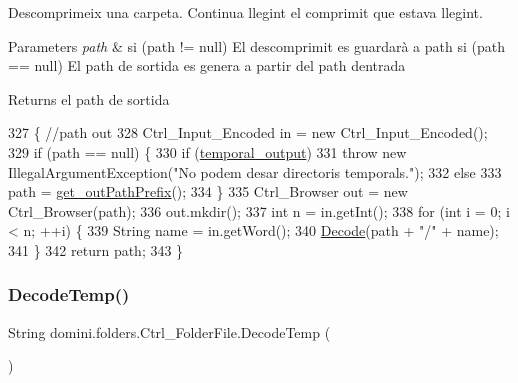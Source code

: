 Descomprimeix una carpeta. Continua llegint el comprimit que estava llegint. 


\begin{DoxyParams}{Parameters}
{\em path} & si (path != null) El descomprimit es guardarà a path si (path == null) El path de sortida es genera a partir del path d\textquotesingle{}entrada \\
\hline
\end{DoxyParams}
\begin{DoxyReturn}{Returns}
el path de sortida 
\end{DoxyReturn}

\begin{DoxyCode}
327                                              \{ \textcolor{comment}{//path out }
328         Ctrl\_Input\_Encoded in = \textcolor{keyword}{new} Ctrl\_Input\_Encoded();
329         \textcolor{keywordflow}{if} (path == null) \{
330             \textcolor{keywordflow}{if} (\hyperlink{classdomini_1_1folders_1_1Ctrl__FolderFile_a0db81590abe27b21a9b8c37633c86fa6}{temporal\_output})
331                 \textcolor{keywordflow}{throw} \textcolor{keyword}{new} IllegalArgumentException(\textcolor{stringliteral}{"No podem desar directoris temporals."});
332             \textcolor{keywordflow}{else}
333                 path = \hyperlink{classdomini_1_1folders_1_1Ctrl__FolderFile_a11c6b1b4a25d12b8091c7c96b3da1ea7}{get\_outPathPrefix}();
334         \}
335         Ctrl\_Browser out = \textcolor{keyword}{new} Ctrl\_Browser(path);
336         out.mkdir();
337         \textcolor{keywordtype}{int} n = in.getInt();
338         \textcolor{keywordflow}{for} (\textcolor{keywordtype}{int} i = 0; i < n; ++i) \{
339             String name = in.getWord();
340             \hyperlink{classdomini_1_1folders_1_1Ctrl__FolderFile_a5d28ac7f5223ecd40a242148e86447c1}{Decode}(path + \textcolor{stringliteral}{"/"} + name);
341         \}
342         \textcolor{keywordflow}{return} path;
343     \}
\end{DoxyCode}
\mbox{\label{classdomini_1_1folders_1_1Ctrl__FolderFile_afa0f6968113855feccccfdbacc00444e}} 
\subsubsection{\texorpdfstring{Decode\+Temp()}{DecodeTemp()}}
{\footnotesize\ttfamily String domini.\+folders.\+Ctrl\+\_\+\+Folder\+File.\+Decode\+Temp (\begin{DoxyParamCaption}{ }\end{DoxyParamCaption})\hspace{0.3cm}{\ttfamily [inline]}}


